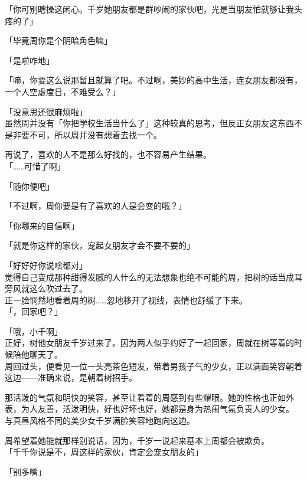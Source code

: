 「你可别瞎操这闲心。千岁她朋友都是群吵闹的家伙吧，光是当朋友怕就够让我头疼的了」

「毕竟周你是个阴暗角色嘛」

「是啦咋地」

「嘛，你要这么说那暂且就算了吧。不过啊，美妙的高中生活，连女朋友都没有，一个人空虚度日，不难受么？」

「没意思还很麻烦啦」\\

虽然周并没有「你把学校生活当什么了」这种较真的思考，但反正女朋友这东西不是非要不可，所以周并没有想着去找一个。

再说了，喜欢的人不是那么好找的，也不容易产生结果。\\

「……可惜了啊」

「随你便吧」

「不过啊，周你要是有了喜欢的人是会变的哦？」

「你哪来的自信啊」

「就是你这样的家伙，宠起女朋友才会不要不要的」

「好好好你说啥都对」\\

觉得自己变成那种甜得发腻的人什么的无法想象也绝不可能的周，把树的话当成耳旁风就这么吹过去了。\\

正一脸悯然地看着周的树……忽地移开了视线，表情也舒缓了下来。\\

「，回家吧？」

「哦，小千啊」\\

正好，树他女朋友千岁过来了。因为两人似乎约好了一起回家，周就在树等着的时候陪他聊天了。\\

周回过头，便看见一位一头亮茶色短发，带着男孩子气的少女，正以满面笑容朝着这边——准确来说，是朝着树招手。

那活泼的气氛和明快的笑容，甚至让看着的周感到有些耀眼。她的性格也正如外表，为人友善，活泼明快，好也好坏也好，她都是身为热闹气氛负责人的少女。\\

与真昼风格不同的美少女千岁满脸笑容地跑向这边。

周希望着她能就那样别说话，因为，千岁一说起来基本上周都会被欺负。\\

「千千你说是不，周这样的家伙，肯定会宠女朋友的」

「别多嘴」

